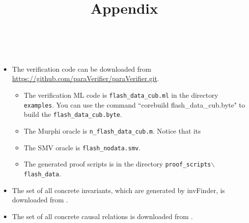 \documentclass{llncs}
\begin{document}
\title{ Appendix }
\author{~}
\authorrunning{~}
\institute{~}

\maketitle
\begin{itemize}
 \item The verification code can be downloaded from \url{https://github.com/paraVerifier/paraVerifier.git}. 
   \begin{itemize} 
    \item The verification ML code is {\tt flash\_data\_cub.ml} in the directory {\tt examples}. You can use the command ``corebuild flash\_data\_cub.byte" to build the {\tt flash\_data\_cub.byte}.
     
     \item The Murphi oracle is {\tt n\_flash\_data\_cub.m}. Notice that its 
     \item The SMV oracle is {\tt flash\_nodata.smv}.
     \item The generated proof scripts is  in the directory {\tt proof\_scripts$\backslash$flash\_data}.

  \end{itemize}

  \item   The set of all  concrete invariants, which are generated by {\sf invFinder}, is downloaded from \url{}.

   \item   The set of all  concrete causal relations is downloaded from \url{}.
\end{itemize}





\end{document}
